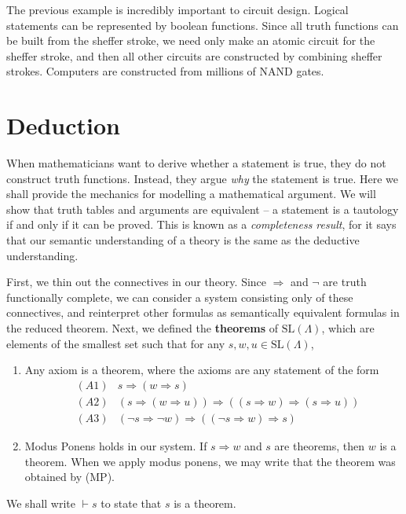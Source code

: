 The previous example is incredibly important to circuit design. Logical statements can be represented by boolean functions. Since all truth functions can be built from the sheffer stroke, we need only make an atomic circuit for the sheffer stroke, and then all other circuits are constructed by combining sheffer strokes. Computers are constructed from millions of NAND gates.




\section{Deduction}

When mathematicians want to derive whether a statement is true, they do not construct truth functions. Instead, they argue {\it why} the statement is true. Here we shall provide the mechanics for modelling a mathematical argument. We will show that truth tables and arguments are equivalent -- a statement is a tautology if and only if it can be proved. This is known as a {\it completeness result}, for it says that our semantic understanding of a theory is the same as the deductive understanding.

First, we thin out the connectives in our theory. Since $\Rightarrow$ and $\neg$ are truth functionally complete, we can consider a system consisting only of these connectives, and reinterpret other formulas as semantically equivalent formulas in the reduced theorem. Next, we defined the {\bf theorems} of $\text{SL}(\Lambda)$, which are elements of the smallest set such that for any $s,w,u \in \text{SL}(\Lambda)$,
    \begin{enumerate}
        \item Any axiom is a theorem, where the axioms are any statement of the form
        \begin{align*}
            &(A1) & s \Rightarrow (w \Rightarrow s)\\
            &(A2) & (s \Rightarrow (w \Rightarrow u)) \Rightarrow ((s \Rightarrow w) \Rightarrow (s \Rightarrow u))\\
            &(A3) & (\neg s \Rightarrow \neg w) \Rightarrow ((\neg s \Rightarrow w) \Rightarrow s)
        \end{align*}
        \item Modus Ponens holds in our system. If $s \Rightarrow w$ and $s$ are theorems, then $w$ is a theorem. When we apply modus ponens, we may write that the theorem was obtained by (MP).
    \end{enumerate}
We shall write $\vdash s$ to state that $s$ is a theorem.

